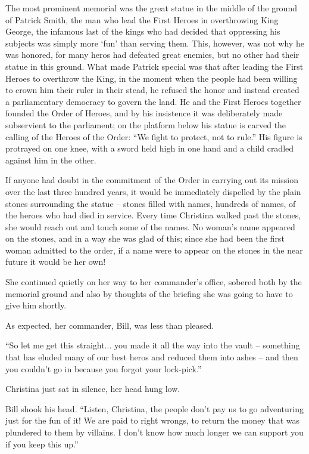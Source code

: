 \documentclass[showtrims,b6paper,draft,10pt]{memoir}
\begin{document}
The most prominent memorial was the great statue in the middle of the ground of Patrick Smith, the man who lead the First Heroes in overthrowing King George, the infamous last of the kings who had decided that oppressing his subjects was simply more `fun' than serving them.  This, however, was not why he was honored, for many heros had defeated great enemies, but no other had their statue in this ground.  What made Patrick special was that after leading the First Heroes to overthrow the King, in the moment when the people had been willing to crown him their ruler in their stead, he refused the honor and instead created a parliamentary democracy to govern the land.  He and the First Heroes together founded the Order of Heroes, and by his insistence it was deliberately made subservient to the parliament;  on the platform below his statue is carved the calling of the Heroes of the Order:  ``We fight to protect, not to rule.''  His figure is protrayed on one knee, with a sword held high in one hand and a child cradled against him in the other.

If anyone had doubt in the commitment of the Order in carrying out its mission over the last three hundred years, it would be immediately dispelled by the plain stones surrounding the statue -- stones filled with names, hundreds of names, of the heroes who had died in service.  Every time Christina walked past the stones, she would reach out and touch some of the names.  No woman's name appeared on the stones, and in a way she was glad of this;  since she had been the first woman admitted to the order, if a name were to appear on the stones in the near future it would be her own!

She continued quietly on her way to her commander's office, sobered both by the memorial ground and also by thoughts of the briefing she was going to have to give him shortly.

\timeskip

As expected, her commander, Bill, was less than pleased.

``So let me get this straight... you made it all the way into the vault -- something that has eluded many of our best heros and reduced them into ashes -- and then you couldn't go in because you forgot your lock-pick.''

Christina just sat in silence, her head hung low.

Bill shook his head.  ``Listen, Christina, the people don't pay us to go adventuring just for the fun of it!  We are paid to right wrongs, to return the money that was plundered to them by villains.  I don't know how much longer we can support you if you keep this up.''
\end{document}
